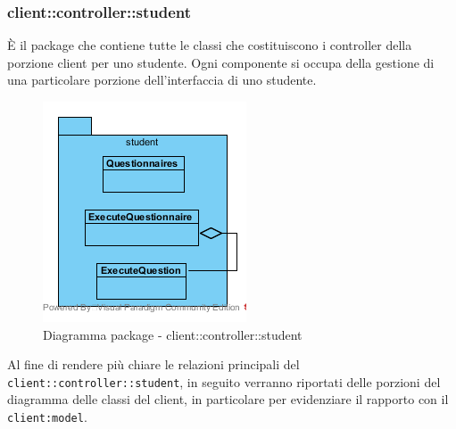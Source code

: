 \subsubsection{client::controller::student}
È il package che contiene tutte le classi che costituiscono i controller della porzione client per uno studente. Ogni componente si occupa della gestione di una particolare porzione dell'interfaccia di uno studente.\begin{center}
	\begin{figure}[H]
		\centering \includegraphics[scale=4, max width=\textwidth, max height=\myheight]{../img/diagrammiClassi/client/controller/student.png}
		\caption{Diagramma package - client::controller::student}
	\end{figure}
\end{center}

Al fine di rendere più chiare le relazioni principali del  \texttt{client::controller::student}, in seguito verranno riportati delle porzioni del diagramma delle classi del client, in particolare per evidenziare il rapporto con il  \texttt{client:model}.

